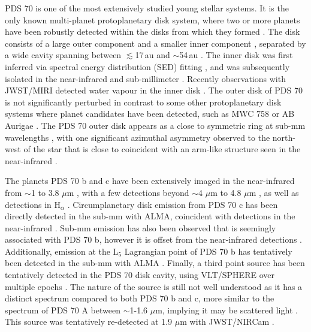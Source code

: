 \documentclass[11pt,twocolumn,twocolappendix]{aastex631}
\begin{document}
PDS 70 is one of the most extensively studied young stellar systems. It is the only known multi-planet protoplanetary disk system, where two or more planets have been robustly detected within the disks from which they formed \citep{kep1,2019NatAs...3..749H}. %
The disk consists of a large outer component and a smaller inner component \citep{kep1}, separated by a wide cavity \citep{2012ApJ...758L..19H,2021AJ....162...99F} spanning between $\lesssim$17\,au and $\sim$54\,au \citep{kep1}.
The inner disk was first inferred via spectral energy distribution (SED) fitting \citep{2012ApJ...758L..19H,2012ApJ...760..111D}, and was subsequently isolated in the near-infrared \citep{kep1} and sub-millimeter \citep{kep2}. Recently observations with JWST/MIRI detected water vapour in the inner disk \citep{2023Natur.620..516P}. The outer disk of PDS 70 is not significantly perturbed in contrast to some other protoplanetary disk systems where planet candidates have been detected, such as MWC 758 \citep{2023NatAs...7.1208W} or AB Aurigae \citep{2022NatAs...6..751C}. The PDS 70 outer disk appears as a close to symmetric ring at sub-mm wavelengths \citep{kep2,2021ApJ...916L...2B}, with one significant azimuthal asymmetry observed to the {north-west} of the star that is close to coincident with an arm-like structure seen in the near-infrared \citep{2020AJ....159..263W,2022A&A...668A.125J}.

The planets PDS 70 b and c have been extensively imaged in the near-infrared from $\sim$1 to 3.8 $\mu$m \citep[e.g.,][]{kep1,2018A&A...617L...2M,2019A&A...632A..25M,2019ApJ...877L..33C,2020AJ....159..263W,2021AJ....161..148W,2021A&A...653A..12C}, with a few detections beyond $\sim$4 $\mu$m to 4.8 $\mu$m \citep{2020A&A...644A..13S,2024arXiv240304855C}, as well as detections in H$_{\alpha}$ \citep{2018ApJ...863L...8W,2019NatAs...3..749H}. Circumplanetary disk emission from PDS 70 c has been directly detected in the sub-mm with ALMA, coincident with detections in the near-infrared \citep{2019ApJ...879L..25I,2021ApJ...916L...2B}. Sub-mm emission has also been observed that is seemingly associated with PDS 70 b, however it is offset from the near-infrared detections \citep{2019ApJ...879L..25I,2021ApJ...916L...2B}. Additionally, emission at the L$_5$ Lagrangian point of PDS 70 b has tentatively been detected in the sub-mm with ALMA \citep{2023A&A...675A.172B}. Finally, a third point source has been tentatively detected in the PDS 70 disk cavity, using VLT/SPHERE over multiple epochs \citep{2019A&A...632A..25M}. The nature of the source is still not well understood as it has a distinct spectrum compared to both PDS 70 b and c, more similar to the spectrum of PDS 70 A between $\sim$1-1.6 $\mu$m, implying it may be scattered light \citep{2019A&A...632A..25M}. This source was tentatively re-detected at 1.9 $\mu$m with JWST/NIRCam \citep{2024arXiv240304855C}.
\end{document}
